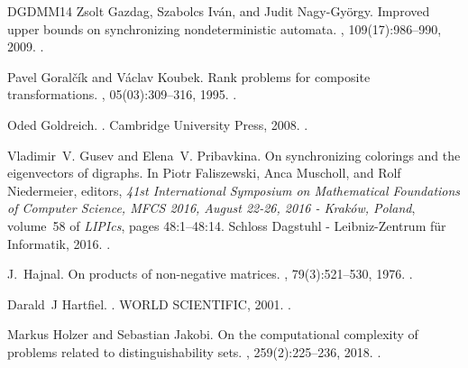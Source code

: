 \documentclass[11pt,a4paper]{amsart}
\theoremstyle{plain}
\theoremstyle{definition}
\theoremstyle{defC}
\theoremstyle{thmC}
\theoremstyle{plain}
\numberwithin{equation}{section}
\begin{document}
\begin{thebibliography}{DGDMM14}
Zsolt Gazdag, Szabolcs Iv{\'{a}}n, and Judit Nagy{-}Gy{\"{o}}rgy.
\newblock Improved upper bounds on synchronizing nondeterministic automata.
, 109(17):986--990, 2009.
\newblock \href {https://doi.org/10.1016/J.IPL.2009.05.007}
  {}.

Pavel Goral\v{c}\'{i}k and V\'{a}clav Koubek.
\newblock Rank problems for composite transformations.
,
  05(03):309--316, 1995.
\newblock \href {https://doi.org/10.1142/S0218196795000185}
  {}.

Oded Goldreich.
.
\newblock Cambridge University Press, 2008.
\newblock \href {https://doi.org/10.1017/CBO9780511804106}
  {}.

Vladimir~V. Gusev and Elena~V. Pribavkina.
\newblock On synchronizing colorings and the eigenvectors of digraphs.
\newblock In Piotr Faliszewski, Anca Muscholl, and Rolf Niedermeier, editors,
  {\em 41st International Symposium on Mathematical Foundations of Computer
  Science, {MFCS} 2016, August 22-26, 2016 - Krak{\'{o}}w, Poland}, volume~58
  of {\em LIPIcs}, pages 48:1--48:14. Schloss Dagstuhl - Leibniz-Zentrum
  f{\"{u}}r Informatik, 2016.
\newblock \href {https://doi.org/10.4230/LIPICS.MFCS.2016.48}
  {}.

J.~Hajnal.
\newblock On products of non-negative matrices.
, 79(3):521--530, 1976.
\newblock \href {https://doi.org/10.1017/S030500410005252X}
  {}.

Darald~J Hartfiel.
.
\newblock WORLD SCIENTIFIC, 2001.
\newblock \href {https://doi.org/10.1142/4707} {}.

Markus Holzer and Sebastian Jakobi.
\newblock On the computational complexity of problems related to
  distinguishability sets.
, 259(2):225--236, 2018.
\newblock \href {https://doi.org/10.1016/J.IC.2017.09.003}
  {}.


\end{thebibliography}
\end{document}
